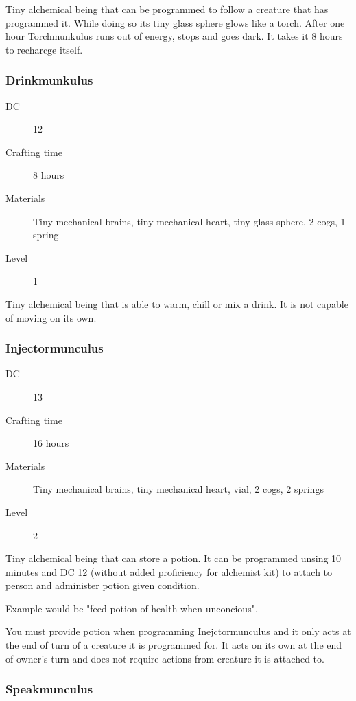Tiny alchemical being that can be programmed to follow a creature that has programmed it. While doing so its tiny glass sphere glows like a torch. After one hour Torchmunkulus runs out of energy, stops and goes dark. It takes it 8 hours to recharcge itself.

\subsubsection{Drinkmunkulus}

\begin{description}
\item [DC] 12 \arcana
\item [Crafting time] 8 hours
\item [Materials] Tiny mechanical brains, tiny mechanical heart, tiny glass sphere, 2 cogs, 1 spring
\item [Level] 1
\end{description}

Tiny alchemical being that is able to warm, chill or mix a drink. It is not capable of moving on its own.

\subsubsection{Injectormunculus}

\begin{description}
\item [DC] 13 \arcana
\item [Crafting time] 16 hours
\item [Materials] Tiny mechanical brains, tiny mechanical heart, vial, 2 cogs, 2 springs
\item [Level] 2
\end{description}

Tiny alchemical being that can store a potion. It can be programmed unsing 10 minutes and DC 12 \intelligence (without added proficiency for alchemist kit) to attach to person and administer potion given condition.

Example would be "feed potion of health when unconcious".

You must provide potion when programming Inejctormunculus and it only acts at the end of turn of a creature it is programmed for. It acts on its own at the end of owner's turn and does not require actions from creature it is attached to.

\subsubsection{Speakmunculus}

